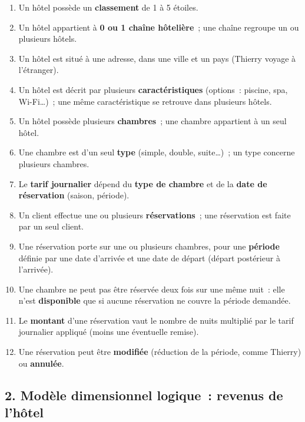 \begin{enumerate}[label=\textbf{RG\arabic*}~:, leftmargin=*]
	\item Un hôtel possède un \textbf{classement} de 1 à 5 étoiles.
	\item Un hôtel appartient à \textbf{0 ou 1 chaîne hôtelière}~; une chaîne regroupe un ou plusieurs hôtels.
	\item Un hôtel est situé à une adresse, dans une ville et un pays (Thierry voyage à l'étranger).
	\item Un hôtel est décrit par plusieurs \textbf{caractéristiques} (options~: piscine, spa, Wi-Fi\dots)~; une même caractéristique se retrouve dans plusieurs hôtels.
	\item Un hôtel possède plusieurs \textbf{chambres}~; une chambre appartient à un seul hôtel.
	\item Une chambre est d'un seul \textbf{type} (simple, double, suite\dots)~; un type concerne plusieurs chambres.
	\item Le \textbf{tarif journalier} dépend du \textbf{type de chambre} et de la \textbf{date de réservation} (saison, période).
	\item Un client effectue une ou plusieurs \textbf{réservations}~; une réservation est faite par un seul client.
	\item Une réservation porte sur une ou plusieurs chambres, pour une \textbf{période} définie par une date d'arrivée et une date de départ (départ postérieur à l'arrivée).
	\item Une chambre ne peut pas être réservée deux fois sur une même nuit~: elle n'est \textbf{disponible} que si aucune réservation ne couvre la période demandée.
	\item Le \textbf{montant} d'une réservation vaut le nombre de nuits multiplié par le tarif journalier appliqué (moins une éventuelle remise).
	\item Une réservation peut être \textbf{modifiée} (réduction de la période, comme Thierry) ou \textbf{annulée}.
\end{enumerate}

\newpage
\subsection*{2. Modèle dimensionnel logique~: revenus de l'hôtel}
{}

